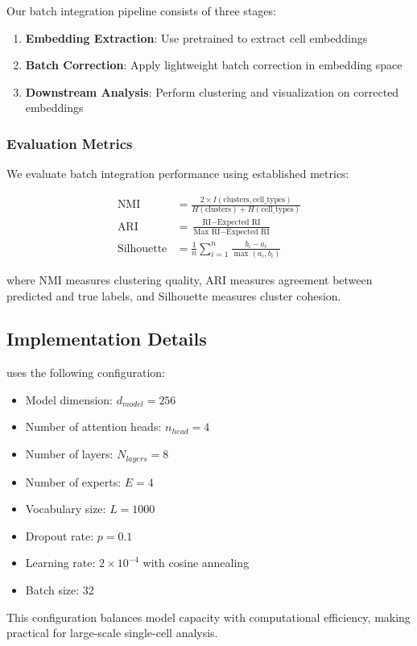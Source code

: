 Our batch integration pipeline consists of three stages:

\begin{enumerate}
\item \textbf{Embedding Extraction}: Use pretrained \bioformer{} to extract cell embeddings
\item \textbf{Batch Correction}: Apply lightweight batch correction in embedding space
\item \textbf{Downstream Analysis}: Perform clustering and visualization on corrected embeddings
\end{enumerate}

\subsubsection{Evaluation Metrics}

We evaluate batch integration performance using established metrics:

\begin{align}
\text{NMI} &= \frac{2 \times I(\text{clusters}, \text{cell\_types})}{H(\text{clusters}) + H(\text{cell\_types})} \\
\text{ARI} &= \frac{\text{RI} - \text{Expected RI}}{\text{Max RI} - \text{Expected RI}} \\
\text{Silhouette} &= \frac{1}{n} \sum_{i=1}^{n} \frac{b_i - a_i}{\max(a_i, b_i)}
\end{align}

where NMI measures clustering quality, ARI measures agreement between predicted and true labels, and Silhouette measures cluster cohesion.

\subsection{Implementation Details}

\bioformer{} uses the following configuration:
\begin{itemize}
\item Model dimension: $d_{model} = 256$
\item Number of attention heads: $n_{head} = 4$
\item Number of layers: $N_{layers} = 8$
\item Number of experts: $E = 4$
\item Vocabulary size: $L = 1000$
\item Dropout rate: $p = 0.1$
\item Learning rate: $2 \times 10^{-4}$ with cosine annealing
\item Batch size: 32
\end{itemize}

This configuration balances model capacity with computational efficiency, making \bioformer{} practical for large-scale single-cell analysis.